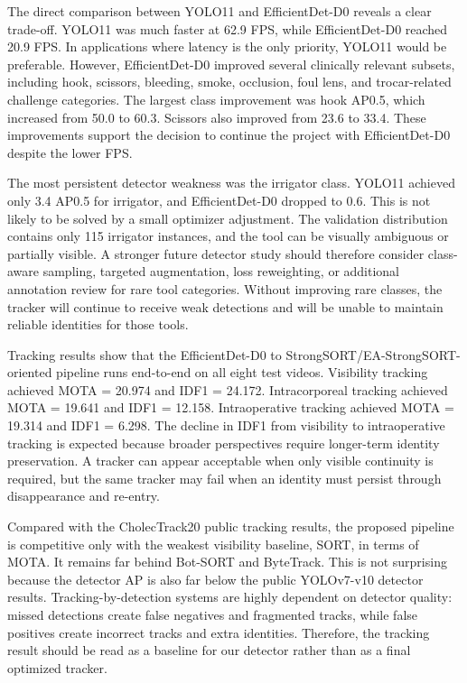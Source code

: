 \documentclass[12pt,a4paper]{article}
\begin{document}
The direct comparison between YOLO11 and EfficientDet-D0 reveals a clear trade-off. YOLO11 was much faster at 62.9 FPS, while EfficientDet-D0 reached 20.9 FPS. In applications where latency is the only priority, YOLO11 would be preferable. However, EfficientDet-D0 improved several clinically relevant subsets, including hook, scissors, bleeding, smoke, occlusion, foul lens, and trocar-related challenge categories. The largest class improvement was hook AP0.5, which increased from 50.0 to 60.3. Scissors also improved from 23.6 to 33.4. These improvements support the decision to continue the project with EfficientDet-D0 despite the lower FPS.

The most persistent detector weakness was the irrigator class. YOLO11 achieved only 3.4 AP0.5 for irrigator, and EfficientDet-D0 dropped to 0.6. This is not likely to be solved by a small optimizer adjustment. The validation distribution contains only 115 irrigator instances, and the tool can be visually ambiguous or partially visible. A stronger future detector study should therefore consider class-aware sampling, targeted augmentation, loss reweighting, or additional annotation review for rare tool categories. Without improving rare classes, the tracker will continue to receive weak detections and will be unable to maintain reliable identities for those tools.

Tracking results show that the EfficientDet-D0 to StrongSORT/EA-StrongSORT-oriented pipeline runs end-to-end on all eight test videos. Visibility tracking achieved MOTA = 20.974 and IDF1 = 24.172. Intracorporeal tracking achieved MOTA = 19.641 and IDF1 = 12.158. Intraoperative tracking achieved MOTA = 19.314 and IDF1 = 6.298. The decline in IDF1 from visibility to intraoperative tracking is expected because broader perspectives require longer-term identity preservation. A tracker can appear acceptable when only visible continuity is required, but the same tracker may fail when an identity must persist through disappearance and re-entry.

Compared with the CholecTrack20 public tracking results, the proposed pipeline is competitive only with the weakest visibility baseline, SORT, in terms of MOTA. It remains far behind Bot-SORT and ByteTrack. This is not surprising because the detector AP is also far below the public YOLOv7-v10 detector results. Tracking-by-detection systems are highly dependent on detector quality: missed detections create false negatives and fragmented tracks, while false positives create incorrect tracks and extra identities. Therefore, the tracking result should be read as a baseline for our detector rather than as a final optimized tracker.
\end{document}
